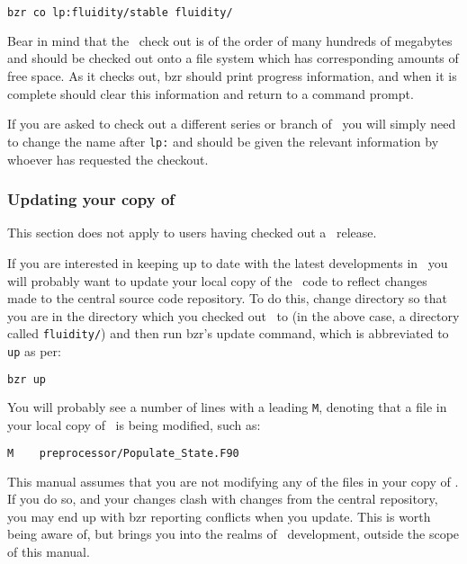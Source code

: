 \begin{lstlisting}[language=Bash]
bzr co lp:fluidity/stable fluidity/
\end{lstlisting}

Bear in mind that the \fluidity\ check out is of the order of many hundreds of
megabytes and should be checked out onto a file system which has corresponding
amounts of free space. As it checks out, bzr should print progress information,
and when it is complete should clear this information and return to a command
prompt.

If you are asked to check out a different series or branch of \fluidity\ you
will simply need to change the name after \lstinline[language=Bash]+lp:+ and
should be given the relevant information by whoever has requested the checkout.

\subsubsection{Updating your copy of \fluidity}
\label{sec:subversion_updating}

This section does not apply to users having checked out a \fluidity\ release.

If you are interested in keeping up to date with the latest developments in
\fluidity\ you will probably want to update your local copy of the \fluidity\
code to reflect changes made to the central source code repository. To do this,
change directory so that you are in the directory which you checked out
\fluidity\ to (in the above case, a directory called
\lstinline[language=Bash]+fluidity/+) and then run bzr's update command, which
is abbreviated to \lstinline[language=Bash]+up+ as per:

\begin{lstlisting}[language=Bash]
bzr up
\end{lstlisting}

You will probably see a number of lines with a leading
\lstinline[language=Bash]+M+, denoting that a file in your local copy of
\fluidity\ is being modified, such as:

\begin{lstlisting}[language=Bash]
M    preprocessor/Populate_State.F90
\end{lstlisting}

This manual assumes that you are not modifying any of the files in your copy of
\fluidity. If you do so, and your changes clash with changes from the central
repository, you may end up with bzr reporting conflicts when you update. This
is worth being aware of, but brings you into the realms of \fluidity\
development, outside the scope of this manual.

